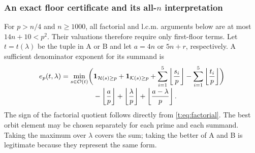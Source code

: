 \documentclass[11pt]{amsart}
\newcommand{\ind}{\mathbf 1}
\theoremstyle{plain}
\theoremstyle{remark}\newtheorem{remark}[theorem]{Remark}
\numberwithin{equation}{section}
\begin{document}
\subsubsection{An exact floor certificate and its all-\texorpdfstring{$n$}{n} interpretation}
For $p>n/4$ and $n\ge1000$, all factorial and l.c.m. arguments below are at
most $14n+10<p^2$. Their valuations therefore require only first-floor terms.
Let $t=t(\lambda)$ be the tuple in A or B and let $a=4n$ or $5n+r$,
respectively. A sufficient denominator exponent for its summand is
\begin{align}
 e_p(t,\lambda)=\min_{s\in\mathcal O(t)}\biggl(&
 \ind_{\mathcal H(s)\ge p}+\ind_{\mathcal K(s)\ge p}
 +\sum_{i=1}^5\left\lfloor\frac{s_i}{p}\right\rfloor
 -\sum_{i=1}^5\left\lfloor\frac{t_i}{p}\right\rfloor\biggr)
 \notag\\*[-1mm]
 &-\left\lfloor\frac ap\right\rfloor
 +\left\lfloor\frac\lambda p\right\rfloor
 +\left\lfloor\frac{a-\lambda}{p}\right\rfloor.
 \label{t:eq:cost-prime}
\end{align}
The sign of the factorial quotient follows directly from
\eqref{t:eq:factorial}. The best orbit element may be chosen separately for
each prime and each summand. Taking the maximum over $\lambda$ covers the
sum; taking the better of A and B is legitimate because they represent the
same form.
\end{document}
